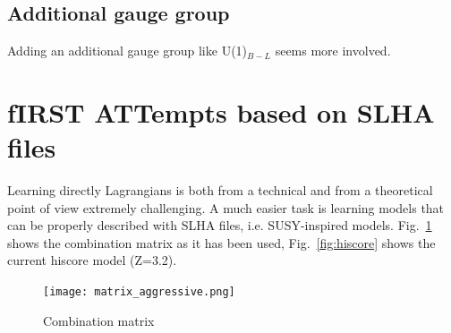 \documentclass[11pt,singleside,a4paper,makeidx,notitlepage]{article}
\begin{document}
\subsection*{Additional gauge group}
\label{sec:gauge}
Adding an additional gauge group like U(1)$_{B-L}$ seems more involved.

\section{fIRST ATTempts based on SLHA files}
\label{sec:slha}
Learning directly Lagrangians is both from a technical and from a theoretical
point of view extremely challenging. A much easier task is learning models
that can be properly described with SLHA files, i.e. SUSY-inspired models.
Fig.~\ref{fig:combinationmatrix} shows the combination matrix as it has been
used, Fig.~\ref{fig:hiscore} shows the current hiscore model (Z=3.2).

\begin{figure}[h!t]
\begin{center}
\texttt{[image: matrix\_aggressive.png]} 
\caption{Combination matrix}
\label{fig:combinationmatrix}
\end{center}
\end{figure}
\end{document}
